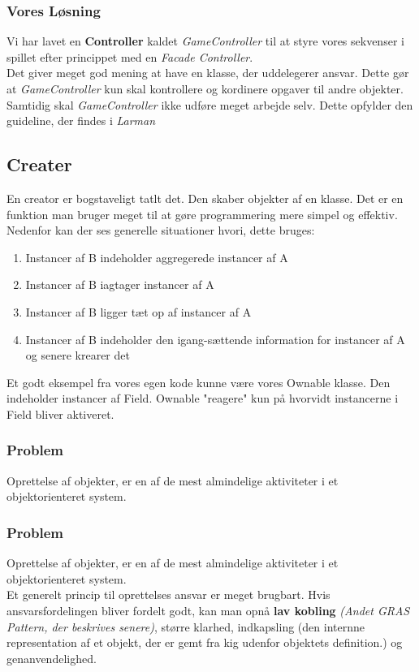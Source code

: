 \subsubsection*{Vores Løsning}
Vi har lavet en \textbf{Controller} kaldet \textit{GameController} til at styre vores sekvenser i spillet efter princippet med en \textit{Facade Controller}. 
\\
Det giver meget god mening at have en klasse, der uddelegerer ansvar. Dette gør at \textit{GameController} kun skal kontrollere og kordinere opgaver til andre objekter. Samtidig skal \textit{GameController} ikke udføre meget arbejde selv. Dette opfylder den guideline, der findes i \textit{Larman}
\subsection{Creater}
En creator er bogstaveligt tatlt det. Den skaber objekter af en klasse. Det er en funktion man bruger meget til at gøre programmering mere simpel og effektiv. Nedenfor kan der ses generelle situationer hvori, dette bruges:
\begin{enumerate}
\item Instancer af B indeholder aggregerede instancer af A
\item Instancer af B iagtager instancer af A
\item Instancer af B ligger tæt op af instancer af A
\item Instancer af B indeholder den igang-sættende information for instancer af A og senere krearer det
\end{enumerate}
Et godt eksempel fra vores egen kode kunne være vores Ownable klasse. Den indeholder instancer af Field. Ownable "reagere" kun på hvorvidt instancerne i Field bliver aktiveret. 
\subsubsection*{Problem}
Oprettelse af objekter, er en af de mest almindelige aktiviteter i et objektorienteret system.
\\
\subsubsection*{Problem}
Oprettelse af objekter, er en af de mest almindelige aktiviteter i et objektorienteret system.
\\
Et generelt princip til oprettelses ansvar er meget brugbart. Hvis ansvarsfordelingen bliver fordelt godt, kan man opnå \textbf{lav kobling} \textit{(Andet GRAS Pattern, der beskrives senere)}, større klarhed, indkapsling (den internne representation af et objekt, der er gemt fra kig udenfor objektets definition.) og genanvendelighed.
